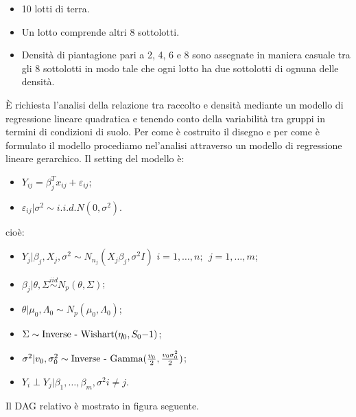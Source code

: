 \begin{itemize}[-]
    \item 10 lotti di terra.
    \item Un lotto comprende altri 8 sottolotti.
    \item Densità di piantagione pari a 2, 4, 6 e 8 sono assegnate in maniera casuale tra
    gli 8 sottolotti in modo tale che ogni lotto ha due sottolotti di ognuna delle densità.
\end{itemize}

È richiesta l'analisi della relazione tra raccolto e densità mediante un modello di regressione
lineare quadratica e tenendo conto della variabilità tra gruppi in termini di condizioni di suolo.
Per come è costruito il disegno e per come è formulato il modello procediamo nel'analisi attraverso
un modello di regressione lineare gerarchico. Il setting del modello è:\\

\begin{itemize}[-]
	\item $ Y_{ij} = {\beta^T_jx_{ij}} + \varepsilon_{ij}$;
	\item $\varepsilon_{ij}|\sigma^2 \sim i.i.d. N(0,\sigma^2)$.
\end{itemize}

cioè:

\begin{itemize}[-]
	\item $Y_j | \beta_j, X_j, \sigma^2 \sim N_{n_j} ({X_j \beta_j}, \sigma^2 {I})$\quad
	$i = 1, \dots, n;\ \  j = 1, \dots, m$; 
	\item $ \beta_j | \theta, \Sigma \stackrel{iid}{\sim} N_{p} (\theta, \Sigma)$;
	\item $\theta| \mu_0,\Lambda_0 \sim N_p(\mu_0,\Lambda_0) $;
	\item $\Sigma \sim \text{\normalfont{Inverse - Wishart}}(\eta_0, S_0{-1})$;
	\item $ \sigma^2 | v_0, \sigma^2_0\sim \text{\normalfont{Inverse - Gamma}}(\frac{v_0}{2}, \frac{v_0\sigma^2_0}{2})$;
	\item $ Y_i \perp Y_j | \beta_1, \dots, \beta_m, \sigma^2 i \neq j$.
\end{itemize}

Il DAG relativo è mostrato in figura seguente.

